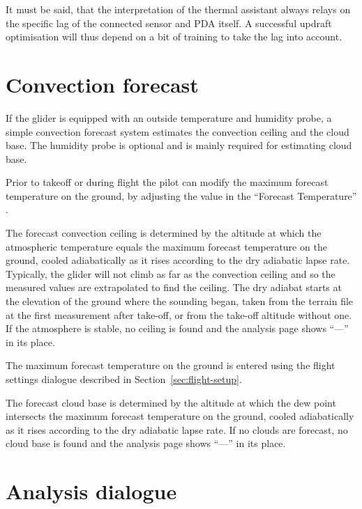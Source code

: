 It must be said, that the interpretation of the thermal assistant always relays
on the specific lag of the connected sensor and PDA itself. A successful
updraft optimisation will thus depend on a bit of training to take the lag into account.


\section{Convection forecast}\label{sec:convection-forecast}

If the glider is equipped with an outside temperature and humidity
probe, a simple convection forecast system estimates the convection
ceiling and the cloud base.  The humidity probe is optional and is
mainly required for estimating cloud base.

Prior to takeoff or during flight the pilot can modify the maximum
forecast temperature on the ground, by adjusting the value in the
``Forecast Temperature'' {\InfoBox}.

The forecast convection ceiling is determined by the altitude at which
the atmospheric temperature equals the maximum forecast temperature on
the ground, cooled adiabatically as it rises according to the dry
adiabatic lapse rate.  Typically, the glider will not climb as far as
the convection ceiling and so the measured values are extrapolated to
find the ceiling.  The dry adiabat starts at the elevation of the
ground where the sounding began, taken from the terrain file at the
first measurement after take-off, or from the take-off altitude
without one.  If the atmosphere is stable, no ceiling is found and the
analysis page shows ``---'' in its place.

The maximum forecast temperature on the ground is entered using the
flight settings dialogue described in Section~\ref{sec:flight-setup}.


%

The forecast cloud base is determined by the altitude at which the dew
point intersects the maximum forecast temperature on the ground,
cooled adiabatically as it rises according to the dry adiabatic lapse
rate.  If no clouds are forecast, no cloud base is found and the
analysis page shows ``---'' in its place.


\section{Analysis dialogue}

